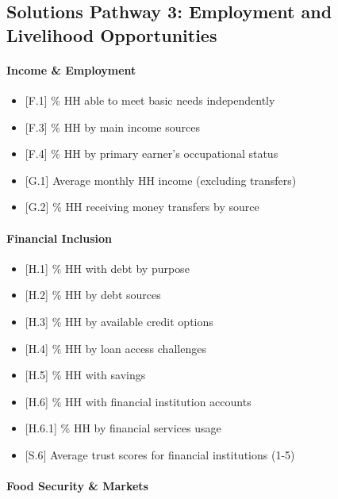 \documentclass[
]{report}
\providecommand{\tightlist}{%
  \setlength{\itemsep}{0pt}\setlength{\parskip}{0pt}}
\begin{document}
\subsection{Solutions Pathway 3: Employment and Livelihood
Opportunities}\label{solutions-pathway-3-employment-and-livelihood-opportunities}

\paragraph{Income \& Employment}\label{income-employment}

\begin{itemize}
\tightlist
\item
  {[}F.1{]} \% HH able to meet basic needs independently
\item
  {[}F.3{]} \% HH by main income sources
\item
  {[}F.4{]} \% HH by primary earner's occupational status
\item
  {[}G.1{]} Average monthly HH income (excluding transfers)
\item
  {[}G.2{]} \% HH receiving money transfers by source
\end{itemize}

\paragraph{Financial Inclusion}\label{financial-inclusion}

\begin{itemize}
\tightlist
\item
  {[}H.1{]} \% HH with debt by purpose
\item
  {[}H.2{]} \% HH by debt sources
\item
  {[}H.3{]} \% HH by available credit options
\item
  {[}H.4{]} \% HH by loan access challenges
\item
  {[}H.5{]} \% HH with savings
\item
  {[}H.6{]} \% HH with financial institution accounts
\item
  {[}H.6.1{]} \% HH by financial services usage
\item
  {[}S.6{]} Average trust scores for financial institutions (1-5)
\end{itemize}

\paragraph{Food Security \& Markets}\label{food-security-markets}
\end{document}
